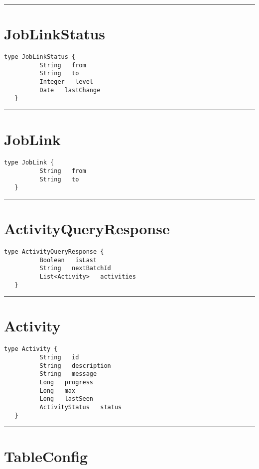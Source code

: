 \rule{12cm}{2pt}
\section{JobLinkStatus}
\label{type:JobLinkStatus}

\begin{lstlisting}[style=nonumbers]
   type JobLinkStatus {
          String   from
          String   to
          Integer   level
          Date   lastChange
   }
\end{lstlisting}

\rule{12cm}{2pt}
\section{JobLink}
\label{type:JobLink}

\begin{lstlisting}[style=nonumbers]
   type JobLink {
          String   from
          String   to
   }
\end{lstlisting}

\rule{12cm}{2pt}
\section{ActivityQueryResponse}
\label{type:ActivityQueryResponse}

\begin{lstlisting}[style=nonumbers]
   type ActivityQueryResponse {
          Boolean   isLast
          String   nextBatchId
          List<Activity>   activities
   }
\end{lstlisting}

\rule{12cm}{2pt}
\section{Activity}
\label{type:Activity}

\begin{lstlisting}[style=nonumbers]
   type Activity {
          String   id
          String   description
          String   message
          Long   progress
          Long   max
          Long   lastSeen
          ActivityStatus   status
   }
\end{lstlisting}

\rule{12cm}{2pt}
\section{TableConfig}
\label{type:TableConfig}

